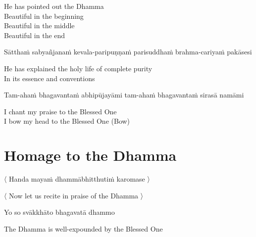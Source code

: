   \begin{english}
    He has pointed out the Dhamma\\
    Beautiful in the beginning\\
    Beautiful in the middle\\
    Beautiful in the end\\
  \end{english}

  \begin{pali-hang}
    Sātthaṁ sabyañjanaṁ kevala-paripuṇṇaṁ parisuddhaṁ brahma-cariyaṁ pakāsesi
  \end{pali-hang}

  \begin{english}
    He has explained the holy life of complete purity\hyperlink{endnote4-appendix}{\hypertarget{endnote4-body}{}}\\
    In its essence and conventions
  \end{english}

  \begin{pali-hang}
    Tam-ahaṁ bhagavantaṁ abhipūjayāmi tam-ahaṁ bhagavantaṁ sirasā namāmi
  \end{pali-hang}

  \begin{english}
    I chant my praise to the Blessed One\\
    I bow my head to the Blessed One \hfill{(Bow)}
  \end{english}

\section{Homage to the Dhamma}
\label{homage-dhamma}

\begin{leader}
  〈 Handa mayaṁ dhammābhitthutiṁ karomase 〉
\end{leader}
\begin{leader-english}
  〈 Now let us recite in praise of the Dhamma 〉
\end{leader-english}

Yo so svākkhāto bhagavatā dhammo

\begin{english}
  The Dhamma is well-expounded by the Blessed One
\end{english}

